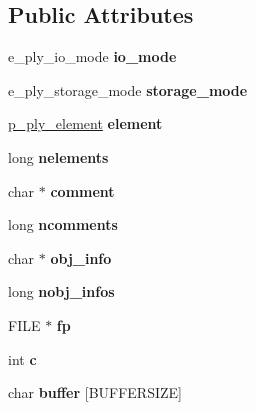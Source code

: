 \subsection*{Public Attributes}
\begin{DoxyCompactItemize}
\item 
\mbox{\label{structt__ply___a9be7c67e21b3920c3b7893d78f21c2e8}} 
e\+\_\+ply\+\_\+io\+\_\+mode {\bfseries io\+\_\+mode}
\item 
\mbox{\label{structt__ply___a2feb88c586425471d4b6e786a4525207}} 
e\+\_\+ply\+\_\+storage\+\_\+mode {\bfseries storage\+\_\+mode}
\item 
\mbox{\label{structt__ply___a7de540782943375c56f31074be82d207}} 
\hyperlink{structt__ply__element__}{p\+\_\+ply\+\_\+element} {\bfseries element}
\item 
\mbox{\label{structt__ply___a42fa31b10e98d40c726384903c4627c4}} 
long {\bfseries nelements}
\item 
\mbox{\label{structt__ply___a3e3fe7d31c905da0fb259cdc9a99f47f}} 
char $\ast$ {\bfseries comment}
\item 
\mbox{\label{structt__ply___ab694821b90645fd2be0d8eb7c6d09fd2}} 
long {\bfseries ncomments}
\item 
\mbox{\label{structt__ply___a515f90aa2fce385e0e7d235de8361b07}} 
char $\ast$ {\bfseries obj\+\_\+info}
\item 
\mbox{\label{structt__ply___abbc32008d7d5b85abd0d90ad3a701264}} 
long {\bfseries nobj\+\_\+infos}
\item 
\mbox{\label{structt__ply___a0637e03cf8c826220eac2865e1c13cd4}} 
F\+I\+LE $\ast$ {\bfseries fp}
\item 
\mbox{\label{structt__ply___ac390febe0010255e5d9439ab6f1d6fcd}} 
int {\bfseries c}
\item 
\mbox{\label{structt__ply___a6376859fab52fad26ba46db78c90a9bb}} 
char {\bfseries buffer} \mbox{[}B\+U\+F\+F\+E\+R\+S\+I\+ZE\mbox{]}

\end{DoxyCompactItemize}
